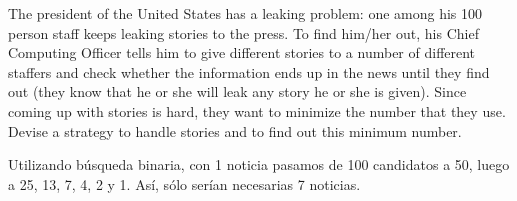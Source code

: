 \documentclass[nochap]{config/ejercicios}
\begin{document}
\begin{problemS} 
The president of the United States has a leaking problem: one among his 100 person staff keeps leaking stories to the press. To find him/her out, his Chief Computing Officer tells him to give different stories to a number of different staffers and check whether the information ends up in the news until they find out (they know that he or she will leak any story he or she is given). Since coming up with stories is hard, they want to minimize the number that they use. Devise a strategy to handle stories and to find out this minimum number. 

Utilizando búsqueda binaria, con 1 noticia pasamos de 100 candidatos a 50, luego a 25, 13, 7, 4, 2 y 1. Así, sólo serían necesarias 7 noticias. 
\end{problemS}
\end{document}
